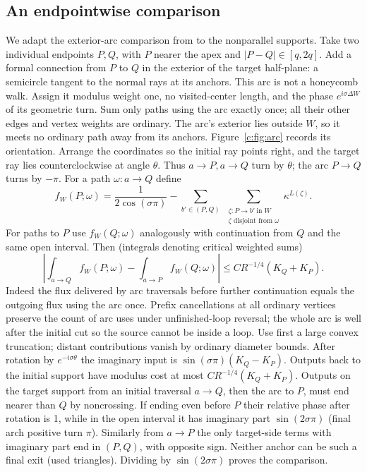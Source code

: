 \subsection{An endpointwise comparison}\label{c:tilted-comparison}
We adapt the exterior-arc comparison from
\cite[proof of Proposition 7.1]{UniformMarked} to the nonparallel supports.
Take two individual endpoints \(P,Q\), with \(P\) nearer the apex and \(|P-Q|\in[q,2q]\). Add a formal connection from $P$ to $Q$ in the exterior of the target half-plane: a semicircle tangent to the normal rays at its anchors. This arc is not a honeycomb walk. Assign it modulus weight one, no visited-center length, and the phase $e^{i\sigma\Delta W}$ of its geometric turn. Sum only paths using the arc exactly once; all their other edges and vertex weights are ordinary. The arc's exterior lies outside $W$, so it meets no ordinary path away from its anchors. Figure~\ref{c:fig:arc} records its orientation. Arrange the coordinates so the initial ray points right, and the target ray lies counterclockwise at angle \(\theta\). Thus \(a\to P,a\to Q\) turn by \(\theta\); the arc \(P\to Q\) turns by \(-\pi\). For a path \(\omega:a\to Q\) define
\[
 f_W(P;\omega)=\frac1{2\cos(\sigma\pi)}-
 \sum_{b'\in(P,Q)}\ 
 \sum_{\substack{\zeta:P\to b'\ \text{in }W\\ \zeta\text{ disjoint from }\omega}}
 \kappa^{L(\zeta)}.
\]
For paths to \(P\) use \(f_W(Q;\omega)\) analogously with continuation from \(Q\) and the same open interval. Then (integrals denoting critical weighted sums)
\[
 \left|\int_{a\to Q} f_W(P;\omega)-\int_{a\to P} f_W(Q;\omega)\right|
 \le C R^{-1/4}(K_Q+K_P).
\]
Indeed the flux delivered by arc traversals before further continuation equals the outgoing flux using the arc once. Prefix cancellations at all ordinary vertices preserve the count of arc uses under unfinished-loop reversal; the whole arc is well after the initial cut so the source cannot be inside a loop. Use first a large convex truncation; distant contributions vanish by ordinary diameter bounds. After rotation by \(e^{-i\sigma\theta}\) the imaginary input is \(\sin(\sigma\pi)(K_Q-K_P)\). Outputs back to the initial support have modulus cost at most \(C R^{-1/4}(K_Q+K_P)\). Outputs on the target support from an initial traversal \(a\to Q\), then the arc to \(P\), must end nearer than \(Q\) by noncrossing. If ending even before \(P\) their relative phase after rotation is 1, while in the open interval it has imaginary part \(\sin(2\sigma\pi)\) (final arch positive turn \(\pi\)). Similarly from \(a\to P\) the only target-side terms with imaginary part end in \((P,Q)\), with opposite sign. Neither anchor can be such a final exit (used triangles). Dividing by \(\sin(2\sigma\pi)\) proves the comparison.



